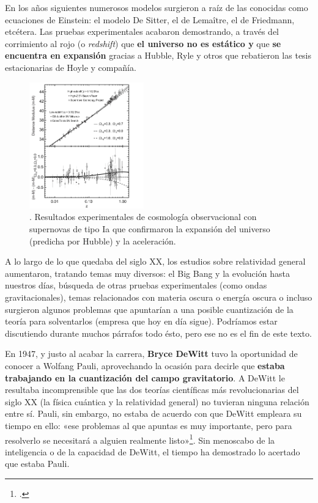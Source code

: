 \documentclass[11pt,a4paper,titlepage]{article}
\begin{document}
En los años siguientes numerosos modelos surgieron a raíz de las conocidas como ecuaciones de Einstein: el modelo De Sitter, el de Lemaître, el de Friedmann, etcétera. Las pruebas experimentales acabaron demostrando, a través del corrimiento al rojo (o \textit{redshift}) que \textbf{el universo no es estático y} que \textbf{se encuentra en expansión} gracias a Hubble, Ryle y otros que rebatieron las tesis estacionarias de Hoyle y compañía.

\begin{figure}
	\centering
	\includegraphics[width=0.44\textwidth]{hubble2}
	\caption{\cite[p.~17]{perlmutterschmidt}. Resultados experimentales de cosmología observacional con supernovas de tipo Ia que confirmaron la expansión del universo (predicha por Hubble) y la aceleración.}
	\label{fig:einstein2}
\end{figure}

A lo largo de lo que quedaba del siglo XX, los estudios sobre relatividad general aumentaron, tratando temas muy diversos: el Big Bang y la evolución hasta nuestros días, búsqueda de otras pruebas experimentales (como ondas gravitacionales), temas relacionados con materia oscura o energía oscura o incluso surgieron algunos problemas que apuntarían a una posible cuantización de la teoría para solventarlos (empresa que hoy en día sigue). Podríamos estar discutiendo durante muchos párrafos todo ésto, pero ese no es el fin de este texto.

En 1947, y justo al acabar la carrera, \textbf{Bryce DeWitt} tuvo la oportunidad de conocer a Wolfang Pauli, aprovechando la ocasión para decirle que \textbf{estaba trabajando en la cuantización del campo gravitatorio}. A DeWitt le resultaba incomprensible que las dos teorías científicas más revolucionarias del siglo XX (la física cuántica y la relatividad general) no tuvieran ninguna relación entre sí. Pauli, sin embargo, no estaba de acuerdo con que DeWitt empleara su tiempo en ello: «ese problemas al que apuntas es muy importante, pero para resolverlo se necesitará a alguien realmente listo»\footnote{\cite[p.~230]{teoriaperfecta}.}. Sin menoscabo de la inteligencia o de la capacidad de DeWitt, el tiempo ha demostrado lo acertado que estaba Pauli.
\end{document}
